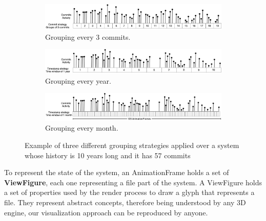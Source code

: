 \begin{figure}
    \begin{center}
        \begin{subfigure}{1\textwidth}
            \includegraphics[width=\linewidth]{TimeWindow1.jpg}
            \caption{Grouping every 3 commits.} 
            \label{fig:TimeWindow1}
        \end{subfigure}
        \begin{subfigure}{1\textwidth}
            \includegraphics[width=\linewidth]{TimeWindow2.jpg}
            \caption{Grouping every year.} 
            \label{fig:TimeWindow2}
        \end{subfigure}
        \begin{subfigure}{1\textwidth}
            \includegraphics[width=\linewidth]{TimeWindow3.jpg}
            \caption{Grouping every month.}
            \label{fig:TimeWindow3}
        \end{subfigure}
        \caption[xample of three different grouping strategies]{Example of three different grouping strategies applied over a system whose history is 10 years long and it has 57 commits}
        \label{fig:TimeWindowExamples}
    \end{center}
\end{figure}



To represent the state of the system, an AnimationFrame holds a set of \textbf{ViewFigure}, each one representing a file part of the system.
\bigbreak
A ViewFigure holds a set of properties used by the render process to draw a glyph that represents a file. They represent abstract concepts, therefore being understood by any 3D engine, our visualization approach can be reproduced by anyone. 

